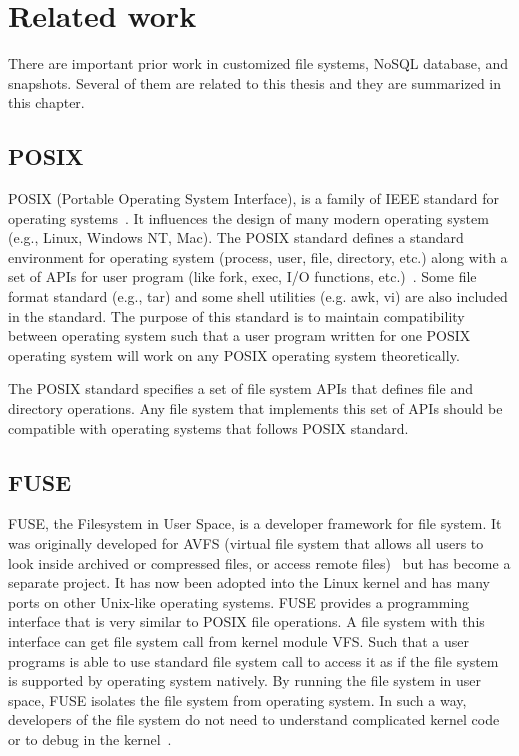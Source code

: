 \chapter{Related work}
\label{chap:related_work}

    There are important prior work in customized file systems, NoSQL database, and snapshots. Several of them are related to this thesis and they are summarized in this chapter.

\section{POSIX}

    POSIX (Portable Operating System Interface), is a family of IEEE standard for operating systems~\cite{posix_wiki}. It influences the design of many modern operating system (e.g., Linux, Windows NT, Mac). The POSIX standard defines a standard environment for operating system (process, user, file, directory, etc.) along with a set of APIs for user program (like fork, exec, I/O functions, etc.)~\cite{posix}. Some file format standard (e.g., tar) and some shell utilities (e.g. awk, vi) are also included in the standard. The purpose of this standard is to maintain compatibility between operating system such that a user program written for one POSIX operating system will work on any POSIX operating system theoretically. 

    The POSIX standard specifies a set of file system APIs that defines file and directory operations. Any file system that implements this set of APIs should be compatible with operating systems that follows POSIX standard.

\section{FUSE}

    FUSE, the Filesystem in User Space, is a developer framework for file system. It was originally developed for AVFS (virtual file system that allows all users
to look inside archived or compressed files, or access remote files)~\cite{avfs} but has become a separate project. It has now been adopted into the Linux kernel and has many ports on other Unix-like operating systems. FUSE provides a programming interface that is very similar to POSIX file operations. A file system with this interface can get file system call from kernel module VFS. Such that a user programs is able to use standard file system call to access it as if the file system is supported by operating system natively. By running the file system in user space, FUSE isolates the file system from operating system. In such a way, developers of the file system do not need to understand complicated kernel code or to debug in the kernel~\cite{fuse}.

